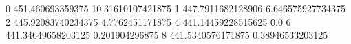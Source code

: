 0 451.460693359375 10.31610107421875
1 447.7911682128906 6.646575927734375
2 445.92083740234375 4.7762451171875
4 441.14459228515625 0.0
6 441.34649658203125 0.201904296875
8 441.5340576171875 0.38946533203125
